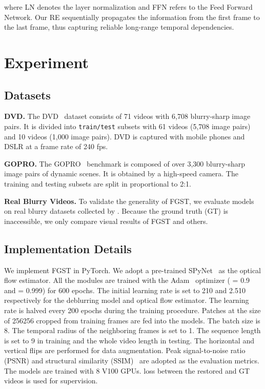 \documentclass{article}
\begin{document}
	where LN denotes the layer normalization and FFN refers to the Feed Forward Network. Our RE sequentially propagates the information from the first frame to the last frame, thus capturing reliable long-range temporal dependencies.
	
	\section{Experiment}
	\vspace{0mm}
\subsection{Datasets}
	\textbf{DVD.} The DVD~\cite{Su} dataset consists of 71 videos with 6,708 blurry-sharp image pairs. It is divided into \texttt{train/test} subsets with 61 videos (5,708 image pairs) and 10 videos (1,000 image pairs). DVD is captured with mobile phones and DSLR at a frame rate of 240 fps.
	
	\noindent\textbf{GOPRO.} The GOPRO~\cite{GoPro} benchmark is composed of over 3,300 blurry-sharp image pairs of dynamic scenes. It is obtained by a high-speed camera. The training and testing subsets are split in proportional to 2:1. 
	
	\noindent\textbf{Real Blurry Videos.} To validate the generality of FGST, we evaluate models on real blurry datasets collected by \cite{real_blur}. Because the ground truth (GT) is inaccessible, we only compare visual results of FGST and others.
	
\vspace{-2mm}
	\subsection{Implementation Details}
	We implement FGST in PyTorch. We adopt a pre-trained SPyNet~\cite{spynet} as the optical flow estimator. All the modules are trained with the Adam~\cite{adam} optimizer ( = 0.9 and  = 0.999) for 600 epochs. The initial learning rate is set to 210 and 2.510 respectively for the deblurring model and optical flow estimator. The learning rate is halved every 200 epochs during the training procedure. Patches at the size of  256256 cropped from training frames are fed into the models. The batch size is 8. The temporal radius  of the neighboring frames is set to 1. The sequence length  is set to 9 in training and the whole video length in testing. The horizontal and vertical flips are performed for data augmentation. Peak signal-to-noise ratio (PSNR) and structural similarity (SSIM)~\cite{ssim} are adopted as the evaluation metrics. The models are trained with 8 V100 GPUs.  loss between the restored and GT videos is used for supervision.
	
\end{document}
